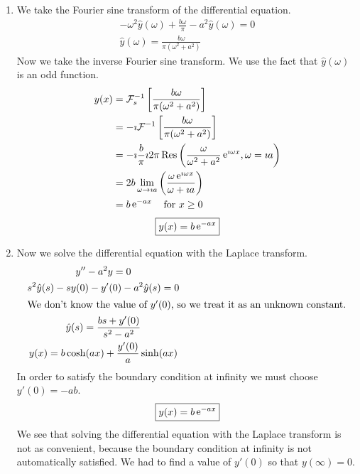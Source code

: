 {\begin{Solution}
\begin{enumerate}
\begin{align*}
    \end{align*}
    \[
    \boxed{
      \mathcal{F}_s[y''] = -\omega^2 \hat{y}_s(\omega) + \frac{\omega}{\pi} y(0)
      }
    \]
  \item
    We take the Fourier sine transform of the differential equation.
    \begin{gather*}
      - \omega^2 \hat{y}(\omega) + \frac{b \omega}{\pi} - a^2 \hat{y}(\omega)= 0 
      \\
      \hat{y}(\omega) = \frac{b \omega}{\pi (\omega^2 + a^2)}
    \end{gather*}
    Now we take the inverse Fourier sine transform.  We use the fact that
    $\hat{y}(\omega)$ is an odd function.
    \begin{align*}
      y(x)    
      &= \mathcal{F}_s^{-1} \left[ \frac{b \omega}{\pi (\omega^2 + a^2)} \right] 
      \\
      &= - \imath \mathcal{F}^{-1} \left[ \frac{b \omega}{\pi (\omega^2 + a^2)} \right] 
      \\
      &= - \imath \frac{b}{\pi} \imath 2 \pi \mathop{\mathrm{Res}}\nolimits \left( \frac{\omega}{\omega^2 + a^2} 
        \mathop{\mathrm{e}}\nolimits^{\imath \omega x}, \omega = \imath a \right) 
      \\
      &= 2 b \lim_{\omega \to \imath a} \left( \frac{\omega \mathop{\mathrm{e}}\nolimits^{\imath \omega x}}{\omega + \imath a} \right) 
      \\
      &= b \mathop{\mathrm{e}}\nolimits^{-a x} \quad \mathrm{for}\ x \geq 0
    \end{align*}
    \[
    \boxed{
      y(x) = b \mathop{\mathrm{e}}\nolimits^{-a x}
      }
    \]
  \item
    Now we solve the differential equation with the Laplace transform.
    \begin{gather*}
      y'' - a^2 y = 0 
      \\
      s^2 \hat{y}(s) - s y(0) - y'(0) - a^2 \hat{y}(s) = 0 
      \\
      \intertext{We don't know the value of $y'(0)$, so we treat it as 
        an unknown constant.}
      \hat{y}(s) = \frac{b s + y'(0)}{s^2 - a^2} 
      \\
      y(x) = b \cosh(a x) + \frac{y'(0)}{a} \sinh(a x) 
    \end{gather*}
    In order to satisfy the boundary condition at infinity we must choose
    $y'(0) = -a b$.
    \[
    \boxed{
      y(x) = b \mathop{\mathrm{e}}\nolimits^{-a x}
      }
    \]
    We see that solving the differential equation with the Laplace transform
    is not as convenient, because the boundary condition at infinity
    is not automatically satisfied.  We had to find a value of $y'(0)$ so
    that $y(\infty) = 0$.
  \end{enumerate}
\end{Solution}







}

